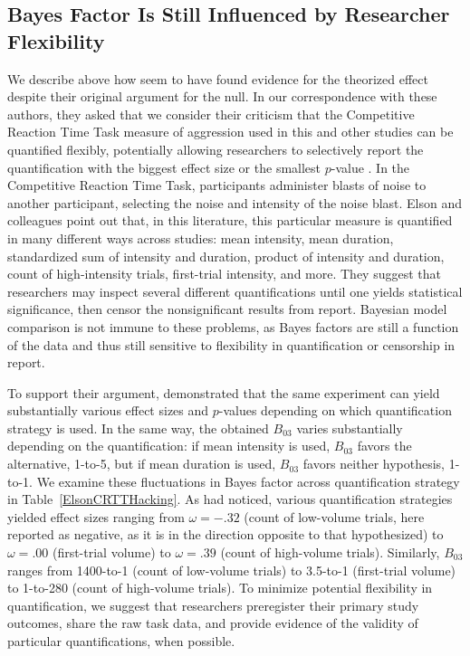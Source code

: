 \documentclass[man]{apa6}
\begin{document}
\subsection{Bayes Factor Is Still Influenced by Researcher Flexibility} 
We describe above how \citet{Elson:etal:2013} seem to have found evidence for the theorized effect despite their original argument for the null. In our correspondence with these authors, they asked that we consider their criticism that the Competitive Reaction Time Task measure of aggression used in this and other studies can be quantified flexibly, potentially allowing researchers to selectively report the quantification with the biggest effect size or the smallest $p$-value \citep{Elson:etal:2014}. In the Competitive Reaction Time Task, participants administer blasts of noise to another participant, selecting the noise and intensity of the noise blast. Elson and colleagues point out that, in this literature, this particular measure is quantified in many different ways across studies: mean intensity, mean duration, standardized sum of intensity and duration, product of intensity and duration, count of high-intensity trials, first-trial intensity, and more. They suggest that researchers may inspect several different quantifications until one yields statistical significance, then censor the nonsignificant results from report. Bayesian model comparison is not immune to these problems, as Bayes factors are still a function of the data and thus still sensitive to flexibility in quantification or censorship in report. 

To support their argument, \citet{Elson:etal:2014} demonstrated that the same experiment can yield substantially various effect sizes and $p$-values depending on which quantification strategy is used. In the same way, the obtained $B_{03}$ varies substantially depending on the quantification: if mean intensity is used, $B_{03}$ favors the alternative, 1-to-5, but if mean duration is used, $B_{03}$ favors neither hypothesis, 1-to-1. We examine these fluctuations in Bayes factor across quantification strategy in Table~\ref{ElsonCRTTHacking}.  As \citet{Elson:etal:2014} had noticed, various quantification strategies yielded effect sizes ranging from $\omega = -.32$ (count of low-volume trials, here reported as negative, as it is in the direction opposite to that hypothesized) to $\omega = .00$ (first-trial volume) to $\omega = .39$ (count of high-volume trials). Similarly, $B_{03}$ ranges from 1400-to-1 (count of low-volume trials) to 3.5-to-1 (first-trial volume) to 1-to-280 (count of high-volume trials). To minimize potential flexibility in quantification, we suggest that researchers preregister their primary study outcomes, share the raw task data, and provide evidence of the validity of particular quantifications, when possible. 
\end{document}
